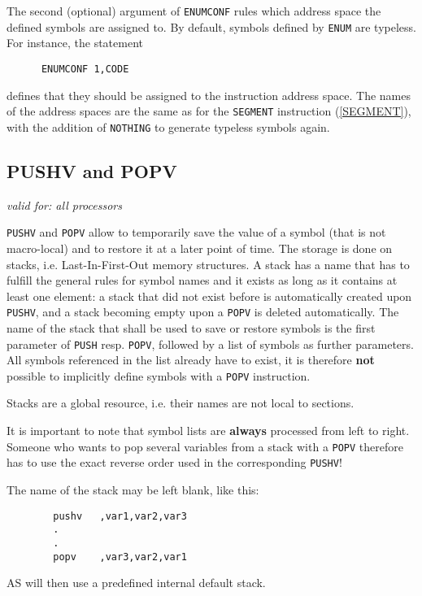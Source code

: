\documentclass[12pt,twoside]{report}
\makeatletter
\newcommand{\bb}[1]{{\bf #1}}
\newcommand{\tty}[1]{{\tt #1}}
\newcommand{\ttindex}[1]{\index{#1@{\tt #1}}}
\makeatother
\begin{document}
The second (optional) argument of \tty{ENUMCONF} rules which
address space the defined symbols are assigned to.  By default,
symbols defined by \tty{ENUM} are typeless.  For instance, the
statement
\begin{verbatim}
      ENUMCONF 1,CODE
\end{verbatim}
defines that they should be assigned to the instruction address
space.  The names of the address spaces are the same as for the
\tty{SEGMENT} instruction (\ref{SEGMENT}), with the addition of
\tty{NOTHING} to generate typeless symbols again.


\subsection{PUSHV and POPV}
\ttindex{PUSHV}\ttindex{POPV}

{\em valid for: all processors}

\tty{PUSHV} and \tty{POPV} allow to temporarily save the value of a symbol
(that is not macro-local) and to restore it at a later point of time.  The
storage is done on stacks, i.e. Last-In-First-Out memory structures.  A
stack has a name that has to fulfill the general rules for symbol names
and it exists as long as it contains at least one element: a stack that
did not exist before is automatically created upon \tty{PUSHV}, and a
stack becoming empty upon a \tty{POPV} is deleted automatically.  The name
of the stack that shall be used to save or restore symbols is the first
parameter of \tty{PUSH} resp. \tty{POPV}, followed by a list of symbols as
further parameters.  All symbols referenced in the list already have to
exist, it is therefore \bb{not} possible to implicitly define symbols with
a \tty{POPV} instruction.

Stacks are a global resource, i.e. their names are not local to
sections.

It is important to note that symbol lists are \bb{always} processed from
left to right.  Someone who wants to pop several variables from a stack
with a \tty{POPV} therefore has to use the exact reverse order used in the
corresponding \tty{PUSHV}!

The name of the stack may be left blank, like this:
\begin{verbatim}
        pushv   ,var1,var2,var3
        .
        .
        popv    ,var3,var2,var1
\end{verbatim}
AS will then use a predefined internal default stack.
\end{document}
